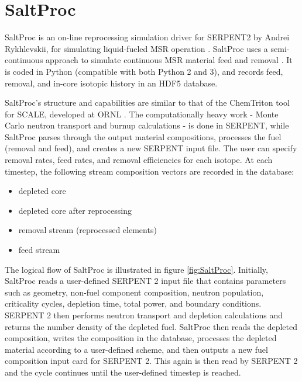 \section{SaltProc}
\label{sec:saltproc}

SaltProc is an on-line reprocessing simulation
driver for SERPENT2 \cite{leppanen_serpent_2015} by Andrei Rykhlevskii,
for simulating liquid-fueled \gls{MSR} operation \cite{rykhlevskii_arfc/saltproc:_2018}.
SaltProc uses a semi-continuous approach to simulate
continuous \gls{MSR} material feed and removal \cite{rykhlevskii_online_2017}.
It is coded in Python (compatible with both Python 2 and 3), and
records feed, removal, and in-core isotopic history in an HDF5 \cite{the_hdf_group_hierarchical_1997} database.

SaltProc's structure and capabilities are similar to that of the
ChemTriton tool for SCALE, developed at ORNL \cite{betzler_molten_2017}.
The computationally heavy work - Monte Carlo neutron transport and
burnup calculations - is done in SERPENT, while SaltProc parses through
the output material compositions, processes the fuel (removal and feed),
and creates a new SERPENT input file. The user can specify removal
rates, feed rates, and removal efficiencies for each isotope. At each
timestep, the following stream composition vectors are recorded in the database:
\begin{itemize}
	\item depleted core
	\item depleted core after reprocessing
	\item removal stream (reprocessed elements)
	\item feed stream
\end{itemize}


The logical flow of SaltProc is illustrated in figure \ref{fig:SaltProc}.
Initially, SaltProc reads a user-defined SERPENT 2 input file that
contains parameters such as  geometry, non-fuel component composition,
neutron population, criticality cycles, depletion time, total power, and boundary conditions.
SERPENT 2 then performs neutron transport and depletion calculations and 
returns the number density of the depleted fuel. SaltProc then reads the
depleted composition, writes the composition in the database, processes
the depleted material according to a user-defined scheme, and then
outputs a new fuel composition input card for SERPENT 2. This again
is then read by SERPENT 2 and the cycle continues until the user-defined
timestep is reached.

